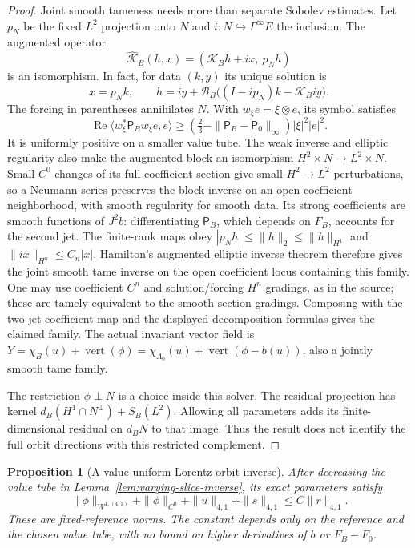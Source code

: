 \documentclass[11pt]{article}
\numberwithin{equation}{section}
\newtheorem{proposition}[theorem]{Proposition}
\theoremstyle{definition}
\theoremstyle{remark}
\begin{document}
\begin{proof}
Joint smooth tameness needs more than separate
Sobolev estimates. Let $p_N$ be the fixed $L^2$
projection onto $N$ and $i:N\hookrightarrow
\Gamma^\infty E$ the inclusion. The augmented operator
\[
 \widehat{\mathcal K}_B(h,x)
     =(\mathcal K_Bh+ix,\ p_Nh)
\]
is an isomorphism. In fact, for data $(k,y)$ its
unique solution is
\[
 x=p_Nk,\qquad
 h=iy+\mathcal B_B\big((I-ip_N)k-\mathcal K_Biy\big).
\]
The forcing in parentheses annihilates $N$.
With $w_\xi e=\xi\otimes e$, its symbol satisfies
\[
 \operatorname{Re}\langle w_\xi^*\mathsf P_Bw_\xi e,e\rangle
 \ge (\tfrac23-\|\mathsf P_B-\mathsf P_0\|_\infty)
                  |\xi|^2|e|^2.
\]
It is uniformly positive on a smaller value tube.
The weak inverse and elliptic regularity also make the
augmented block an isomorphism $H^2\times N\to L^2\times N$.
Small $C^0$ changes of its full coefficient section
give small $H^2\to L^2$ perturbations, so a Neumann
series preserves the block inverse on an open coefficient
neighborhood, with smooth regularity for smooth data.
Its strong coefficients are smooth functions of
$J^2b$: differentiating $\mathsf P_B$, which depends
on $F_B$, accounts for the second jet.
The finite-rank maps obey
$|p_Nh|\le\|h\|_2\le\|h\|_{H^1}$ and
$\|ix\|_{H^n}\le C_n|x|$.
Hamilton's augmented elliptic inverse theorem
\cite[II.3.3.3--II.3.3.4, pp.~158--159]{Hamilton1982NashMoser}
therefore gives the joint smooth tame inverse on the
open coefficient locus containing this family.
One may use coefficient $C^n$ and solution/forcing
$H^n$ gradings, as in the source; these are tamely
equivalent to the smooth section gradings.
Composing with the two-jet coefficient map and the
displayed decomposition formulas gives the claimed
family. The actual invariant vector field is
$Y=\chi_B(u)+\operatorname{vert}(\phi)
=\chi_{A_0}(u)+\operatorname{vert}(\phi-b(u))$,
also a jointly smooth tame family.

The restriction $\phi\perp N$ is a choice inside
this solver. The residual projection has kernel
$d_B(H^1\cap N^\perp)+S_B(L^2)$.
Allowing all parameters adds its finite-dimensional
residual on $d_BN$ to that image. Thus the result
does not identify the full orbit directions with
this restricted complement.
\end{proof}

\begin{proposition}[A value-uniform Lorentz orbit inverse]
\label{prop:lorentz-orbit-inverse}
After decreasing the value tube in
Lemma~\ref{lem:varying-slice-inverse}, its exact parameters satisfy
\[
 \|\phi\|_{W^{1,(4,1)}}+\|\phi\|_{C^0}
       +\|u\|_{4,1}+\|s\|_{4,1}\le C\|r\|_{4,1}.
\]
These are fixed-reference norms. The constant depends only on
the reference and the chosen value tube, with no bound on
higher derivatives of $b$ or $F_B-F_0$.
\end{proposition}
\end{document}
